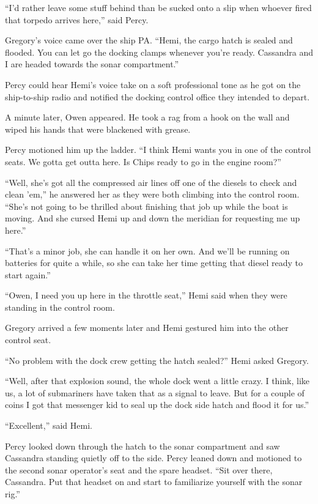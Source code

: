 \documentclass[
]{scrbook}
\begin{document}
``I'd rather leave some stuff behind than be sucked onto a slip when
whoever fired that torpedo arrives here,'' said Percy.

Gregory's voice came over the ship PA. ``Hemi, the cargo hatch is sealed
and flooded. You can let go the docking clamps whenever you're ready.
Cassandra and I are headed towards the sonar compartment.''

Percy could hear Hemi's voice take on a soft professional tone as he got
on the ship-to-ship radio and notified the docking control office they
intended to depart.

A minute later, Owen appeared. He took a rag from a hook on the wall and
wiped his hands that were blackened with grease.

Percy motioned him up the ladder. ``I think Hemi wants you in one of the
control seats. We gotta get outta here. Is Chips ready to go in the
engine room?''

``Well, she's got all the compressed air lines off one of the diesels to
check and clean 'em,'' he answered her as they were both climbing into
the control room. ``She's not going to be thrilled about finishing that
job up while the boat is moving. And she cursed Hemi up and down the
meridian for requesting me up here.''

``That's a minor job, she can handle it on her own. And we'll be running
on batteries for quite a while, so she can take her time getting that
diesel ready to start again.''

``Owen, I need you up here in the throttle seat,'' Hemi said when they
were standing in the control room.

Gregory arrived a few moments later and Hemi gestured him into the other
control seat.

``No problem with the dock crew getting the hatch sealed?'' Hemi asked
Gregory.

``Well, after that explosion sound, the whole dock went a little crazy.
I think, like us, a lot of submariners have taken that as a signal to
leave. But for a couple of coins I got that messenger kid to seal up the
dock side hatch and flood it for us.''

``Excellent,'' said Hemi.

Percy looked down through the hatch to the sonar compartment and saw
Cassandra standing quietly off to the side. Percy leaned down and
motioned to the second sonar operator's seat and the spare headset.
``Sit over there, Cassandra. Put that headset on and start to
familiarize yourself with the sonar rig.''
\end{document}
